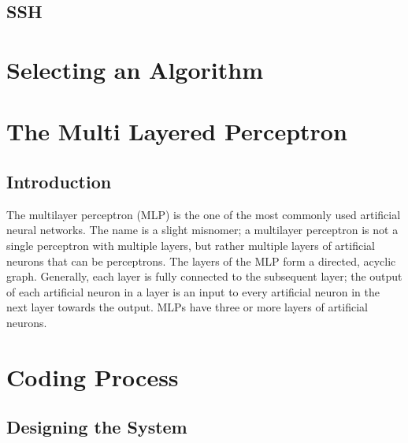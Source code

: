 \documentclass[12pt]{article}
\begin{document}
\subsection{SSH}

\newpage
\section{Selecting an Algorithm}

\newpage
\section{The Multi Layered Perceptron}
\subsection{Introduction}
The multilayer perceptron (MLP) is the one of the most commonly used artificial neural networks. The name is a slight misnomer; a multilayer perceptron is not a single perceptron with multiple layers, but rather multiple layers of artificial neurons
that can be perceptrons. The layers of the MLP form a directed, acyclic graph. Generally, each layer is fully connected to the subsequent layer; the output of each artificial neuron in a layer is an input to every artificial neuron in the next layer
towards the output. MLPs have three or more layers of artificial neurons.

\newpage
\section{Coding Process}
\subsection{Designing the System}
\end{document}
